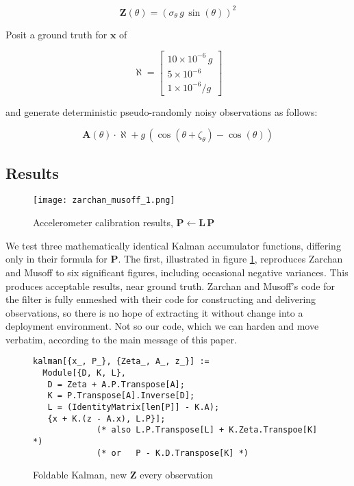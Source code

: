 \documentclass[10pt,oneside,x11names]{article}
\begin{document}
\begin{equation}
\mathbold{Z}(\theta) = \left(\sigma_\theta\,g\,\sin(\theta)\right)^2
\end{equation}

Posit a ground truth for \(\mathbold{x}\) of

\begin{equation}
\mathbold{\aleph} =
\begin{bmatrix}
10\times{10^{-6}}\,g \\
5\times{10^{-6}}\\
1\times{10^{-6}}/g
\end{bmatrix}
\end{equation}

\noindent and generate deterministic pseudo-randomly noisy observations as
follows:

\begin{equation}
\mathbold{A}(\theta)\cdot\aleph + g\,(\cos(\theta + \zeta_\theta) -\cos(\theta))
\end{equation}

\subsection{Results}
\label{sec:orgheadline24}

\begin{figure}[htb]
\centering
\texttt{[image: zarchan\_musoff\_1.png]}
\caption{\label{fig:orgparagraph3}
Accelerometer calibration results, \(\mathbold{P}\leftarrow\mathbold{L}\,\mathbold{P}\)}
\end{figure}

We test three mathematically identical Kalman accumulator functions,
differing only in their formula for \(\mathbold{P}\). The first, illustrated in
figure \ref{fig:orgparagraph3}, reproduces Zarchan and Musoff to six significant
figures, including occasional negative variances. This produces acceptable
results, near ground truth. Zarchan and Musoff's code for the filter is
fully enmeshed with their code for constructing and delivering
observations, so there is no hope of extracting it without change into a
deployment environment. Not so our code, which we can harden and move verbatim,
according to the main message of this paper.

\newpage

\begin{figure}
\begin{verbatim}
kalman[{x_, P_}, {Zeta_, A_, z_}] :=
  Module[{D, K, L},
   D = Zeta + A.P.Transpose[A];
   K = P.Transpose[A].Inverse[D];
   L = (IdentityMatrix[len[P]] - K.A);
   {x + K.(z - A.x), L.P}];
             (* also L.P.Transpose[L] + K.Zeta.Transpoe[K] *)
             (* or   P - K.D.Transpose[K] *)
\end{verbatim}
\caption{Foldable Kalman, new $\mathbold{Z}$ every observation}
\end{figure}
\end{document}
